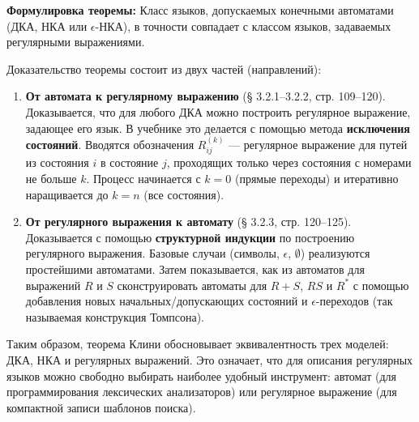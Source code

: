 \documentclass[a4paper,12pt]{article}
\begin{document}
\textbf{Формулировка теоремы:} Класс языков, допускаемых конечными автоматами (ДКА, НКА или \(\epsilon\)-НКА), в точности совпадает с классом языков, задаваемых регулярными выражениями. 

Доказательство теоремы состоит из двух частей (направлений):

\begin{enumerate}
    \item \textbf{От автомата к регулярному выражению} (§ 3.2.1–3.2.2, стр. 109–120). Доказывается, что для любого ДКА можно построить регулярное выражение, задающее его язык. В учебнике это делается с помощью метода \textbf{исключения состояний}. Вводятся обозначения \(R_{ij}^{(k)}\) — регулярное выражение для путей из состояния \(i\) в состояние \(j\), проходящих только через состояния с номерами не больше \(k\). Процесс начинается с \(k=0\) (прямые переходы) и итеративно наращивается до \(k=n\) (все состояния). 
    \item \textbf{От регулярного выражения к автомату} (§ 3.2.3, стр. 120–125). Доказывается с помощью \textbf{структурной индукции} по построению регулярного выражения. Базовые случаи (символы, \(\epsilon\), \(\emptyset\)) реализуются простейшими автоматами. Затем показывается, как из автоматов для выражений \(R\) и \(S\) сконструировать автоматы для \(R+S\), \(RS\) и \(R^*\) с помощью добавления новых начальных/допускающих состояний и \(\epsilon\)-переходов (так называемая конструкция Томпсона).
\end{enumerate}

Таким образом, теорема Клини обосновывает эквивалентность трех моделей: ДКА, НКА и регулярных выражений. Это означает, что для описания регулярных языков можно свободно выбирать наиболее удобный инструмент: автомат (для программирования лексических анализаторов) или регулярное выражение (для компактной записи шаблонов поиска).
\end{document}
